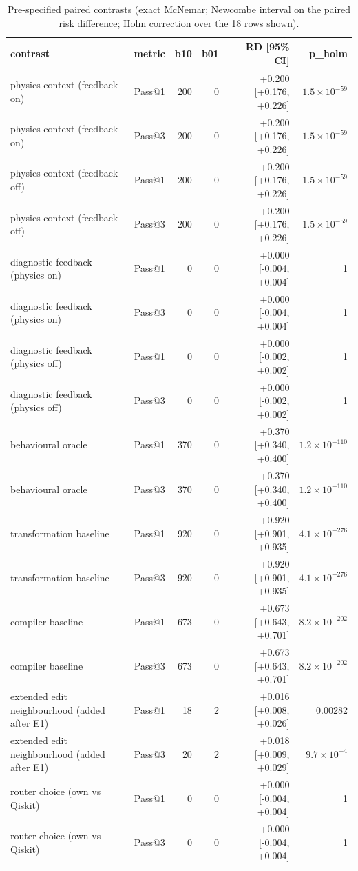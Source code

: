 \begin{table}[t]
\centering
\caption{Pre-specified paired contrasts (exact McNemar; Newcombe interval on the paired risk difference; Holm correction over the 18 rows shown).}
\label{tab:contrasts}
\footnotesize
\setlength{\tabcolsep}{3pt}
\begin{tabular}{lrrrrr}
\toprule
contrast & metric & b10 & b01 & RD [95\% CI] & p\_holm \\
\midrule
physics context (feedback on) & Pass@1 & 200 & 0 & +0.200 [+0.176, +0.226] & $1.5\times 10^{-59}$ \\
physics context (feedback on) & Pass@3 & 200 & 0 & +0.200 [+0.176, +0.226] & $1.5\times 10^{-59}$ \\
physics context (feedback off) & Pass@1 & 200 & 0 & +0.200 [+0.176, +0.226] & $1.5\times 10^{-59}$ \\
physics context (feedback off) & Pass@3 & 200 & 0 & +0.200 [+0.176, +0.226] & $1.5\times 10^{-59}$ \\
diagnostic feedback (physics on) & Pass@1 & 0 & 0 & +0.000 [-0.004, +0.004] & 1 \\
diagnostic feedback (physics on) & Pass@3 & 0 & 0 & +0.000 [-0.004, +0.004] & 1 \\
diagnostic feedback (physics off) & Pass@1 & 0 & 0 & +0.000 [-0.002, +0.002] & 1 \\
diagnostic feedback (physics off) & Pass@3 & 0 & 0 & +0.000 [-0.002, +0.002] & 1 \\
behavioural oracle & Pass@1 & 370 & 0 & +0.370 [+0.340, +0.400] & $1.2\times 10^{-110}$ \\
behavioural oracle & Pass@3 & 370 & 0 & +0.370 [+0.340, +0.400] & $1.2\times 10^{-110}$ \\
transformation baseline & Pass@1 & 920 & 0 & +0.920 [+0.901, +0.935] & $4.1\times 10^{-276}$ \\
transformation baseline & Pass@3 & 920 & 0 & +0.920 [+0.901, +0.935] & $4.1\times 10^{-276}$ \\
compiler baseline & Pass@1 & 673 & 0 & +0.673 [+0.643, +0.701] & $8.2\times 10^{-202}$ \\
compiler baseline & Pass@3 & 673 & 0 & +0.673 [+0.643, +0.701] & $8.2\times 10^{-202}$ \\
extended edit neighbourhood (added after E1) & Pass@1 & 18 & 2 & +0.016 [+0.008, +0.026] & 0.00282 \\
extended edit neighbourhood (added after E1) & Pass@3 & 20 & 2 & +0.018 [+0.009, +0.029] & $9.7\times 10^{-4}$ \\
router choice (own vs Qiskit) & Pass@1 & 0 & 0 & +0.000 [-0.004, +0.004] & 1 \\
router choice (own vs Qiskit) & Pass@3 & 0 & 0 & +0.000 [-0.004, +0.004] & 1 \\
\bottomrule
\end{tabular}
\end{table}
